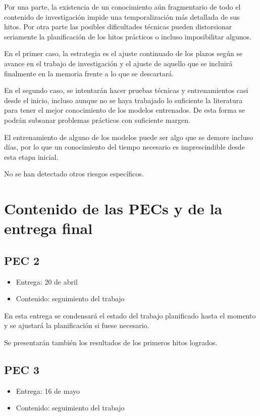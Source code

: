 Por una parte, la existencia de un conocimiento aún fragmentario de todo el contenido de investigación impide una temporalización más detallada de sus hitos. Por otra parte las posibles dificultades técnicas pueden distorsionar seriamente la planificación de los hitos prácticos o incluso imposibilitar algunos.

En el primer caso, la estrategia es el ajuste continuado de los plazos según se avance en el trabajo de investigación y el ajuste de aquello que se incluirá finalmente en la memoria frente a lo que se descartará.

En el segundo caso, se intentarán hacer pruebas técnicas y entrenamientos casi desde el inicio, incluso aunque no se haya trabajado lo suficiente la literatura para tener el mejor conocimiento de los modelos entrenados. De esta forma se podrán subsanar problemas prácticos con suficiente margen.

El entrenamiento de alguno de los modelos puede ser algo que se demore incluso días, por lo que un conocimiento del tiempo necesario es imprescindible desde esta etapa inicial.

No se han detectado otros riesgos específicos.

\section{Contenido de las PECs y de la entrega final}

\subsection{PEC 2}

\begin{itemize}
    \item Entrega: 20 de abril
    \item Contenido: seguimiento del trabajo
\end{itemize}

En esta entrega se condensará el estado del trabajo planificado hasta el momento y se ajustará la planificación si fuese necesario.

Se presentarán también los resultados de los primeros hitos logrados.

\subsection{PEC 3}

\begin{itemize}
    \item Entrega: 16 de mayo
    \item Contenido: seguimiento del trabajo
\end{itemize}

